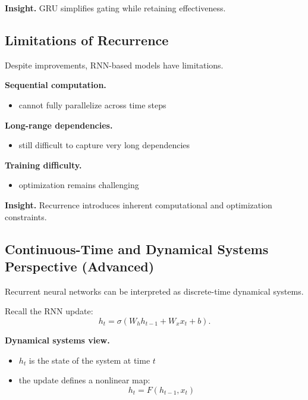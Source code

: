 \medskip

\noindent
\textbf{Insight.}  
GRU simplifies gating while retaining effectiveness.

\subsection{Limitations of Recurrence}

Despite improvements, RNN-based models have limitations.

\medskip

\noindent
\textbf{Sequential computation.}

\begin{itemize}
    \item cannot fully parallelize across time steps
\end{itemize}

\medskip

\noindent
\textbf{Long-range dependencies.}

\begin{itemize}
    \item still difficult to capture very long dependencies
\end{itemize}

\medskip

\noindent
\textbf{Training difficulty.}

\begin{itemize}
    \item optimization remains challenging
\end{itemize}

\medskip

\noindent
\textbf{Insight.}  
Recurrence introduces inherent computational and optimization constraints.

\subsection{Continuous-Time and Dynamical Systems Perspective (Advanced)}

Recurrent neural networks can be interpreted as discrete-time dynamical systems.

\medskip

\noindent
Recall the RNN update:
\[
h_t = \sigma(W_h h_{t-1} + W_x x_t + b).
\]

\medskip

\noindent
\textbf{Dynamical systems view.}

\begin{itemize}
    \item $h_t$ is the state of the system at time $t$
    \item the update defines a nonlinear map:
    \[
    h_t = F(h_{t-1}, x_t)
    \]
\end{itemize}

